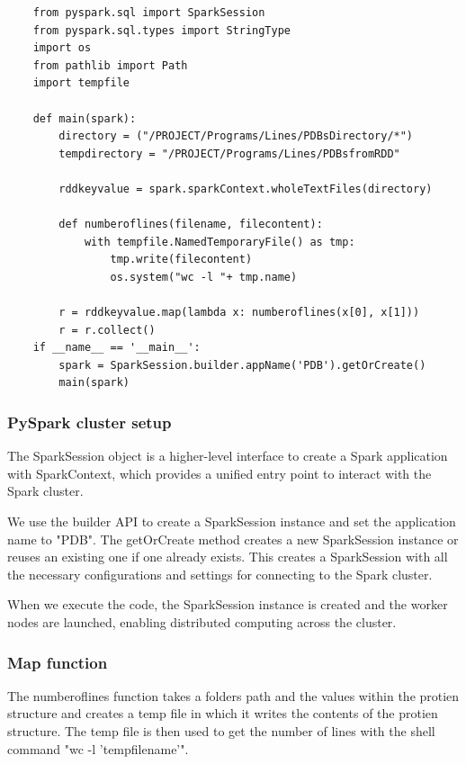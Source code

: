 \documentclass[]{final_report}
\begin{document}
\begin{lstlisting}
    from pyspark.sql import SparkSession
    from pyspark.sql.types import StringType
    import os
    from pathlib import Path
    import tempfile

    def main(spark):
        directory = ("/PROJECT/Programs/Lines/PDBsDirectory/*")
        tempdirectory = "/PROJECT/Programs/Lines/PDBsfromRDD"

        rddkeyvalue = spark.sparkContext.wholeTextFiles(directory)

        def numberoflines(filename, filecontent):
            with tempfile.NamedTemporaryFile() as tmp:
                tmp.write(filecontent)
                os.system("wc -l "+ tmp.name)

        r = rddkeyvalue.map(lambda x: numberoflines(x[0], x[1]))
        r = r.collect()
    if __name__ == '__main__':
        spark = SparkSession.builder.appName('PDB').getOrCreate()
        main(spark)

\end{lstlisting}

\clearpage

\subsubsection{PySpark cluster setup}

The SparkSession object is a higher-level interface to create a Spark application with SparkContext, which provides a unified entry point to interact with the Spark cluster.

We use the builder API to create a SparkSession instance and set the application name to "PDB". The getOrCreate method creates a new SparkSession instance or reuses an existing one if one already exists. This creates a SparkSession with all the necessary configurations and settings for connecting to the Spark cluster.

When we execute the code, the SparkSession instance is created and the worker nodes are launched, enabling distributed computing across the cluster.

\subsubsection{Map function}
The numberoflines function takes a folders path and the values within the protien structure and creates a temp file in which it writes the contents of the protien structure. The temp file is then used to get the number of lines with the shell command "wc -l 'tempfilename'".
\end{document}
